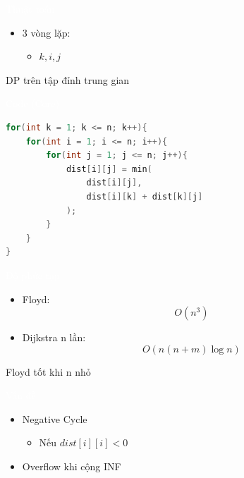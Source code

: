 \documentclass{beamer}
\newcommand{\hlred}[1]{\textcolor{myred}{#1}}
\newcommand{\hlpurple}[1]{\textcolor{mypurple}{#1}}
\newcommand{\hlwhite}[1]{\textcolor{white}{#1}}
\begin{document}

\begin{frame}{\hlwhite{Thuật toán}}
\begin{itemize}
\item 3 vòng lặp:
\begin{itemize}
\item $k, i, j$
\end{itemize}
\end{itemize}

\begin{tcolorbox}
\centering
\hlpurple{DP trên tập đỉnh trung gian}
\end{tcolorbox}
\end{frame}


\begin{frame}[fragile]{\hlwhite{Code (Core)}}
\begin{lstlisting}[language=C++]
for(int k = 1; k <= n; k++){
    for(int i = 1; i <= n; i++){
        for(int j = 1; j <= n; j++){
            dist[i][j] = min(
                dist[i][j],
                dist[i][k] + dist[k][j]
            );
        }
    }
}
\end{lstlisting}
\end{frame}


\begin{frame}{\hlwhite{Độ phức tạp}}
\begin{itemize}
\item Floyd:
\[
O(n^3)
\]

\item Dijkstra n lần:
\[
O(n (n + m)\log n)
\]
\end{itemize}

\begin{tcolorbox}
\centering
\hlred{Floyd tốt khi n nhỏ}
\end{tcolorbox}
\end{frame}


\begin{frame}{\hlwhite{Vấn đề}}
\begin{itemize}
\item \hlred{Negative Cycle}
\begin{itemize}
\item Nếu $dist[i][i] < 0$
\end{itemize}

\item Overflow khi cộng INF
\end{itemize}
\end{frame}
\end{document}
